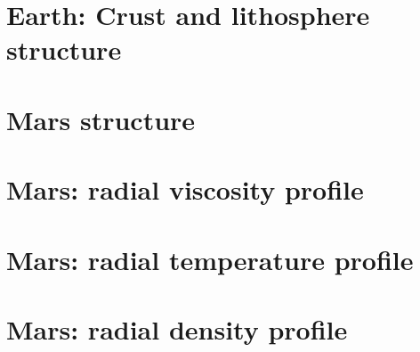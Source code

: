 \section{Earth: Crust and lithosphere structure}  %



\newpage %
\section{Mars structure} 
\newpage %
\section{Mars: radial viscosity profile} 
\newpage %
\section{Mars: radial temperature profile} 
\newpage %
\section{Mars: radial density profile} 

